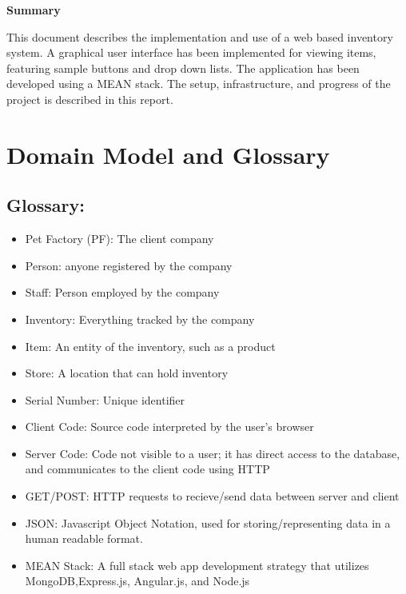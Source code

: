 \documentclass[letterpaper, 12pt]{article}
\title{\vspace{-8ex}}
\author{\vspace{-8ex}}
\date{\vspace{-7ex}}
\begin{document}
\fontsize{12}{12}
\maketitle
\thispagestyle{fancy}

%
%
\noindent \large\textbf{Summary}

\noindent This document describes the implementation and use of a web based inventory system. A graphical user interface has been implemented for viewing items, featuring sample buttons and drop down lists. The application has been developed using a MEAN stack. The setup, infrastructure, and progress of the project is described in this report.


\tableofcontents

\newpage
%
%
%
%
%
%
%
%
\section{Domain Model and Glossary}

\subsection{Glossary:}
%
%
\begin{itemize}
\item Pet Factory (PF): The client company
\item Person: anyone registered by the company
\item Staff: Person employed by the company
\item Inventory: Everything tracked by the company
\item Item: An entity of the inventory, such as a product
\item Store: A location that can hold inventory
\item Serial Number: Unique identifier
\item Client Code: Source code interpreted by the user's browser
\item Server Code: Code not visible to a user; it has direct access to the database, and communicates to the client code using HTTP
\item GET/POST: HTTP requests to recieve/send data between server and client
\item JSON: Javascript Object Notation, used for storing/representing data in a human readable format.
\item MEAN Stack: A full stack web app development strategy that utilizes MongoDB,Express.js, Angular.js, and Node.js

\end{itemize}
\end{document}
